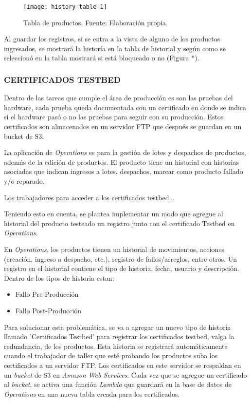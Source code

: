\begin{figure}[H]
	\centering
	\texttt{[image: history-table-1]}
	\caption{\label{fig:history-view} Tabla de productos. Fuente: Elaboración propia.}
\end{figure}

Al guardar los registros, si se entra a la vista de alguno de los productos ingresados, se mostrará la historía en la tabla de historial y según como se seleccionó en la tabla mostrará si está bloqueado o no (Figura *).
\iffalse
\subsubsection{CERTIFICADOS TESTBED}

Dentro de las tareas que cumple el área de producción es son las pruebas del hardware, cada prueba queda documentada con
un certificado en donde se indica si el hardware pasó o no las pruebas para seguir con su producción. Estos certificados son
almacenados en un servidor FTP que después se guardan en un bucket de S3.

La aplicación de \textit{Operations} es para la gestión de lotes y despachos de productos, además de la edición de productos.
El producto tiene un historial con historias asociadas que indican ingresos a lotes, despachos, marcar como producto fallado y/o reparado.

Los trabajadores para acceder a los certificados testbed...

Teniendo esto en cuenta, se plantea implementar un modo que agregue al historial del producto testeado un registro junto con el certificado Testbed en \textit{Operations}.

En \textit{Operations}, los productos tienen un historial de movimientos, acciones (creación, ingreso a despacho, etc.), registro de fallos/arreglos, entre otros.
Un registro en el historial contiene el tipo de historia, fecha, usuario y descripción. Dentro de los tipos de historia estan:
\begin{itemize}
    \item Fallo Pre-Producción
    \item Fallo Post-Producción
\end{itemize}

Para solucionar esta problemática, se va a agregar un nuevo tipo de historia llamado 'Certificados Testbed' para registrar los certificados testbed, valga la redundancia, de los productos.
Esta historia se registrará automáticamente cuando el trabajador de taller que esté probando los productos suba los certificados a un servidor FTP. Los certificados en este servidor se respaldan en un \textit{bucket} de S3 en \textit{Amazon Web Services}.
Cada vez que se agregue un certificado al \textit{bucket}, se activa una función \textit{Lambda} que guardará en la base de datos de \textit{Operations} en una nueva tabla creada para los certificados.

